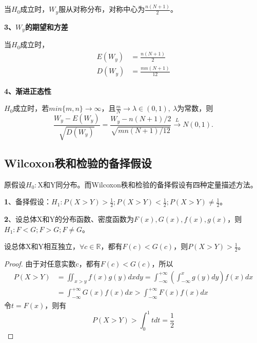 \documentclass[lang=cn,10pt]{elegantbook}
\begin{document}
\begin{proposition}
    当$H_0$成立时，$W_y$服从对称分布，对称中心为$\frac{n(N+1)}{2}$。
\end{proposition}

\textbf{3、$W_y$的期望和方差}
\begin{proposition}
    当$H_0$成立时，
    \begin{equation}
        \begin{aligned}
            E(W_y) & = \frac{n(N+1)}{2}   \\
            D(W_y) & = \frac{mn(N+1)}{12}
        \end{aligned}
    \end{equation}
\end{proposition}

\textbf{4、渐进正态性}
\begin{proposition}
    $H_0$成立时，若$min\{m,n\}\rightarrow \infty$，且$\frac{m}N \rightarrow \lambda \in (0,1),~\lambda$为常数，则
    \begin{equation}
        \frac{W_y-E(W_y)}{\sqrt{D(W_y)}}=\frac{W_y-n\left(N+1\right)/2}{\sqrt{mn\left(N+1\right)/12}}\xrightarrow{L}N(0,1).
    \end{equation}
\end{proposition}

\subsection{Wilcoxon秩和检验的备择假设}
原假设$H_0:$X和Y同分布。而Wilcoxon秩和检验的备择假设有四种定量描述方法。

\textbf{1}、备择假设：$H_1:P(X>Y)>\frac12;P(X>Y)<\frac12;P(X>Y)\neq \frac12$。

\textbf{2}、设总体X和Y的分布函数、密度函数为$F(x),G(x),f(x),g(x)$，则$H_1:F < G; F > G; F\neq G$。
\begin{theorem}
    设总体X和Y相互独立，$\forall c\in \mathbb{R} $，都有$F(c)<G(c)$，则$P(X>Y)>\frac12$。
\end{theorem}
\begin{proof}
    由于对任意实数c，都有$F(c) < G(c)$，所以
    \begin{equation*}
        \begin{aligned}
            P(X > Y) & = \iint_{x > y} f(x)g(y) dxdy = \int_{-\infty}^{+\infty} (\int_{-\infty}^{x} g(y) dy )f(x) dx \\
                     & = \int_{-\infty}^{+\infty}G(x)f(x)dx > \int_{-\infty}^{+\infty} F(x) f(x)dx
        \end{aligned}
    \end{equation*}
    令$t = F(x)$，则有
    \begin{equation*}
        P(X > Y) > \int_{0}^{1} t dt = \frac12
    \end{equation*}
\end{proof}
\end{document}
